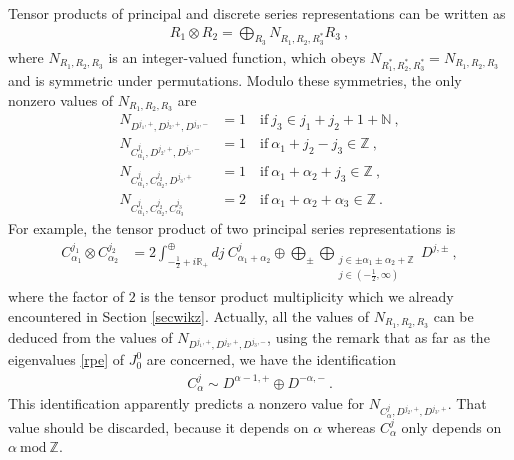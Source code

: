 \documentclass[12pt,a4paper,notitlepage]{report}
\numberwithin{equation}{section}
\theoremstyle{break}
\begin{document}
Tensor products of principal and discrete series representations can be written as 
\begin{align}
 R_1\otimes R_2 = \bigoplus_{R_3} N_{R_1,R_2,R_3^*} R_3\ ,
\label{ror}
\end{align}
where $N_{R_1,R_2,R_3}$ is an integer-valued function, which obeys $N_{R_1^*,R_2^*,R_3^*}=N_{R_1,R_2,R_3}$ and is symmetric under permutations.
Modulo these symmetries, the only nonzero values of $N_{R_1,R_2,R_3}$ are
\begin{align}
N_{D^{j_1,+},D^{j_2,+},D^{j_3,-}} &= 1 \quad \text{if}\ j_3\in j_1+j_2+1+{\mathbb{N}}\ ,
\label{nddd}
\\
N_{C^{j_1}_{\alpha_1},D^{j_2,+},D^{j_3,-}} &= 1 \quad \text{if}\ \alpha_1+j_2-j_3\in{\mathbb{Z}}\ ,
\\
 N_{C^{j_1}_{\alpha_1},C^{j_2}_{\alpha_2},D^{j_3,+}} &= 1 \quad \text{if}\ \alpha_1+\alpha_2+j_3\in {\mathbb{Z}}\ ,
\\
N_{C^{j_1}_{\alpha_1},C^{j_2}_{\alpha_2},C^{j_3}_{\alpha_3}} &= 2 \quad \text{if}\ \alpha_1+\alpha_2+\alpha_3\in {\mathbb{Z}}\ .
\end{align}
For example, the tensor product of two principal series representations is
\begin{align}
 C^{j_1}_{\alpha_1}\otimes C^{j_2}_{\alpha_2} &= 2\int^\oplus_{-\frac12+i{\mathbb{R}}_+} dj\ C^j_{\alpha_1+\alpha_2} 
\oplus \bigoplus_\pm \bigoplus_{\substack{j\in \pm\alpha_1\pm\alpha_2+{\mathbb{Z}}\\ j\in(-\frac12,\infty)}} D^{j,\pm} \ ,
\label{coc}
\end{align}
where the factor of $2$ is the tensor product multiplicity which we already encountered in Section \ref{secwikz}.
Actually, all the values of $N_{R_1,R_2,R_3}$ can be deduced from the values of $N_{D^{j_1,+},D^{j_2,+},D^{j_3,-}}$, using the remark that as far as the eigenvalues \eqref{rpe} of $J^0_0$ are concerned, we have the identification
\begin{align}
 C^j_\alpha \sim D^{\alpha-1,+} \oplus D^{-\alpha,-}\ .
\label{cjdd}
\end{align}
This identification apparently predicts a nonzero value for $N_{C^j_\alpha,D^{j_2,+},D^{j_3,+}}$.
That value should be discarded, because it depends on $\alpha$ whereas $C^j_\alpha$ only depends on $\alpha\ \text{mod}\ {\mathbb{Z}}$.
\end{document}
